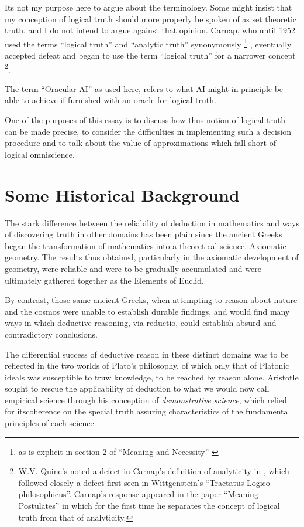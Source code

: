 \documentclass[10pt,titlepage]{article}
\begin{document}
Its not my purpose here to argue about the terminology.
Some might insist that my conception of logical truth should more properly be spoken of as set theoretic truth, and I do not intend to argue against that opinion.
Carnap, who until 1952 used the terms ``logical truth'' and ``analytic truth'' synonymously %
\footnote{as is explicit in section 2 of ``Meaning and Necessity'' \cite{carnap56}}%
, eventually accepted defeat and began to use the term ``logical truth'' for a narrower concept%
\footnote{W.V. Quine's noted a defect in Carnap's definition of analyticity in \cite{carnap56}, which followed closely a defect first seen in Wittgenstein's ``Tractatus Logico-philosophicus''\cite{Wittgenstein1921}.
Carnap's response appeared in the paper ``Meaning Postulates''\cite{carnap52} in which for the first time he separates the concept of logical truth from that of analyticity.}.

The term ``Oracular AI'' as used here, refers to what AI might in principle be able to achieve if furnished with an oracle for logical truth.

One of the purposes of this essay is to discuss how thus notion of logical truth can be made precise, to consider the difficulties in implementing such a decision procedure and to talk about the value of approximations which fall short of logical omniscience.

\section{Some Historical Background}

The stark difference between the reliability of deduction in mathematics and ways of discovering truth in other domains has been plain since the ancient Greeks began the transformation of mathematics into a theoretical science.
Axiomatic geometry.
The results thus obtained, particularly in the axiomatic development of geometry, were reliable and were to be gradually accumulated and were ultimately gathered together as the Elements of Euclid.

By contrast, those same ancient Greeks, when attempting to reason about nature and the cosmos were unable to establish durable findings, and would find many ways in which deductive reasoning, via reductio, could establish absurd and contradictory conclusions.

The differential success of deductive reason in these distinct domains was to be reflected in the two worlds of Plato's philosophy, of which only that of Platonic ideals was susceptible to truw knowledge, to be reached by reason alone.
Aristotle sought to rescue the applicability of deduction to what we would now call empirical science through his conception of \emph{demonstrative science}, which relied for itscoherence on the special truth assuring characteristics of the fundamental principles of each science.
\end{document}
